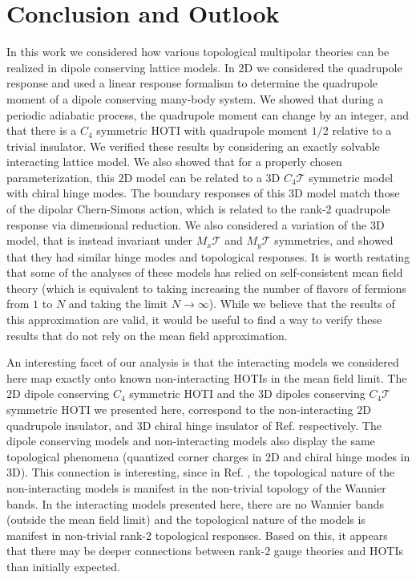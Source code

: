 \documentclass[prb,aps,twocolumn,groupaddress,floatfix]{revtex4-1}
\begin{document}
 
\section{Conclusion and Outlook}\label{sec:conclusion}

In this work we considered how various topological multipolar theories can be realized in dipole conserving lattice models. In $2$D we considered the quadrupole response and used a linear response formalism to determine the quadrupole moment of a dipole conserving many-body system. We showed that during a periodic adiabatic process, the quadrupole moment can change by an integer, and that there is a $C_4$ symmetric HOTI with quadrupole moment $1/2$ relative to a trivial insulator. 
We verified these results by considering an exactly solvable interacting lattice model. We also showed that for a properly chosen parameterization, this $2$D model can be related to a $3$D $C_4 \mathcal{T}$ symmetric model with chiral hinge modes. The boundary responses of this $3$D model match those of the dipolar Chern-Simons action, which is related to the rank-2 quadrupole response via dimensional reduction. We also considered a variation of the $3$D model, that is instead invariant under $M_x \mathcal{T}$ and $M_y \mathcal{T}$ symmetries, and showed that they had similar hinge modes and topological responses. It is worth restating that some of the analyses of these models has relied on self-consistent mean field theory (which is equivalent to taking increasing the number of flavors of fermions from $1$ to $N$ and taking the limit $N \rightarrow \infty$). While we believe that the results of this approximation are valid, it would be useful to find a way to verify these results that do not rely on the mean field approximation. 


An interesting facet of our analysis is that the interacting models we considered here map exactly onto known non-interacting HOTIs in the mean field limit. The $2$D dipole conserving $C_4$ symmetric HOTI and the $3$D dipoles conserving $C_4\mathcal{T}$ symmetric HOTI we presented here, correspond to the non-interacting $2$D quadrupole insulator, and $3$D chiral hinge insulator of Ref.  respectively. The dipole conserving models and non-interacting models also display the same topological phenomena (quantized corner charges in $2$D and chiral hinge modes in $3$D). This connection is interesting, since in Ref. , the topological nature of the non-interacting models is manifest in the non-trivial topology of the Wannier bands. In the interacting models presented here, there are no Wannier bands (outside the mean field limit) and the topological nature of the models is manifest in non-trivial rank-2 topological responses. Based on this, it appears that there may be deeper connections between rank-2 gauge theories and HOTIs than initially expected. 
\end{document}
